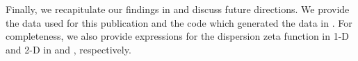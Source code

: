Finally, we recapitulate our findings in  and discuss future directions.
We provide the data used for this publication and the code which generated the data in .  For completeness, we also provide expressions for the dispersion zeta function in 1-D and 2-D in  and , respectively.
